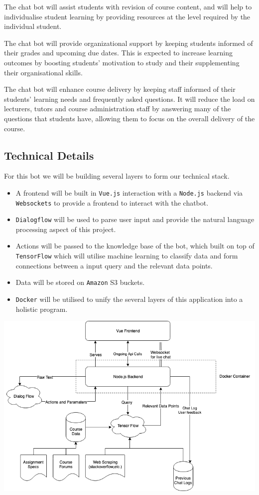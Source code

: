 \documentclass{article}
\begin{document}
The chat bot will assist students with revision of course content, and will help to individualise student learning by providing resources at the level required by the individual student.

The chat bot will provide organizational support by keeping students informed of their grades and upcoming due dates. This is expected to increase learning outcomes by boosting students' motivation to study and their supplementing their organisational skills.

The chat bot will enhance course delivery by keeping staff informed of their students' learning needs and frequently asked questions. It will reduce the load on lecturers, tutors and course administration staff by answering many of the questions that students have, allowing them to focus on the overall delivery of the course. 


\subsection{Technical Details}

For this bot we will be building several layers to form our technical stack.

\begin{itemize}
  \item A frontend will be built in \texttt{Vue.js} interaction with a \texttt{Node.js} backend via \texttt{Websockets} to provide a frontend to interact with the chatbot.
  \item \texttt{Dialogflow} will be used to parse user input and provide the natural language processing aspect of this project.
  \item Actions will be passed to the knowledge base of the bot, which built on top of \texttt{TensorFlow} which will utilise machine learning to classify data and form connections between a input query and the relevant data points.
  \item Data will be stored on \texttt{Amazon} S3 buckets.
  \item \texttt{Docker} will be utilised to unify the several layers of this application into a holistic program. 
\end{itemize}

\includegraphics[width=\textwidth]{architecture_diagram.png}
\end{document}
